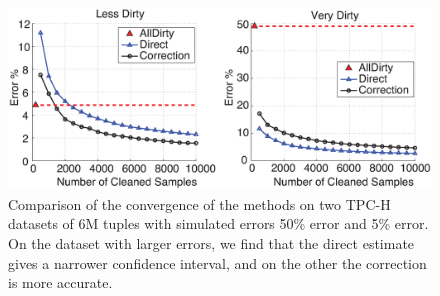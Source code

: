 \begin{figure}
\includegraphics[width=.6\columnwidth]{figs/allerror-samplesize.eps}
\caption{Comparison of the convergence of the methods on two TPC-H datasets of 6M tuples with simulated errors 50\% error and 5\% error. On the dataset with larger errors, we find that the direct estimate gives a narrower confidence interval, and on the other the correction is more accurate.  \label{fig:est2}}
\end{figure}



